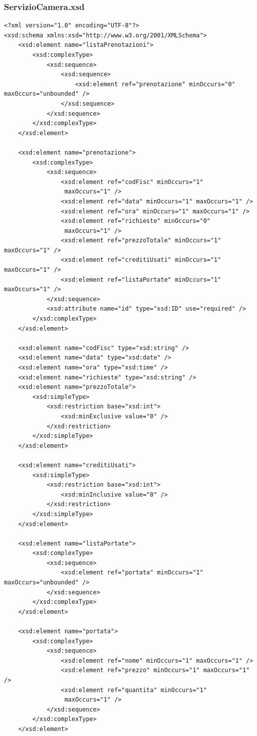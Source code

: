 \documentclass [a4paper, 12pt]{book}
\begin{document}
\subsubsection{ServizioCamera.xsd}
\begin{lstlisting}[style=XML]
<?xml version="1.0" encoding="UTF-8"?>
<xsd:schema xmlns:xsd="http://www.w3.org/2001/XMLSchema">
    <xsd:element name="listaPrenotazioni">
        <xsd:complexType>
            <xsd:sequence>
                <xsd:sequence>
                    <xsd:element ref="prenotazione" minOccurs="0" maxOccurs="unbounded" />
                </xsd:sequence>
            </xsd:sequence>
        </xsd:complexType>
    </xsd:element>

    <xsd:element name="prenotazione">
        <xsd:complexType>
            <xsd:sequence>
                <xsd:element ref="codFisc" minOccurs="1"
                 maxOccurs="1" />
                <xsd:element ref="data" minOccurs="1" maxOccurs="1" />
                <xsd:element ref="ora" minOccurs="1" maxOccurs="1" />
                <xsd:element ref="richieste" minOccurs="0"
                 maxOccurs="1" />
                <xsd:element ref="prezzoTotale" minOccurs="1" maxOccurs="1" />
                <xsd:element ref="creditiUsati" minOccurs="1" maxOccurs="1" />
                <xsd:element ref="listaPortate" minOccurs="1" maxOccurs="1" />
            </xsd:sequence>
            <xsd:attribute name="id" type="xsd:ID" use="required" />
        </xsd:complexType>
    </xsd:element>

    <xsd:element name="codFisc" type="xsd:string" />
    <xsd:element name="data" type="xsd:date" />
    <xsd:element name="ora" type="xsd:time" />
    <xsd:element name="richieste" type="xsd:string" />
    <xsd:element name="prezzoTotale">
        <xsd:simpleType>
            <xsd:restriction base="xsd:int">
                <xsd:minExclusive value="0" />
            </xsd:restriction>
        </xsd:simpleType>
    </xsd:element>

    <xsd:element name="creditiUsati">
        <xsd:simpleType>
            <xsd:restriction base="xsd:int">
                <xsd:minInclusive value="0" />
            </xsd:restriction>
        </xsd:simpleType>
    </xsd:element>

    <xsd:element name="listaPortate">
        <xsd:complexType>
            <xsd:sequence>
                <xsd:element ref="portata" minOccurs="1" maxOccurs="unbounded" />
            </xsd:sequence>
        </xsd:complexType>
    </xsd:element>

    <xsd:element name="portata">
        <xsd:complexType>
            <xsd:sequence>
                <xsd:element ref="nome" minOccurs="1" maxOccurs="1" />
                <xsd:element ref="prezzo" minOccurs="1" maxOccurs="1" />
                <xsd:element ref="quantita" minOccurs="1"
                 maxOccurs="1" />
            </xsd:sequence>
        </xsd:complexType>
    </xsd:element>


\end{lstlisting}
\end{document}
